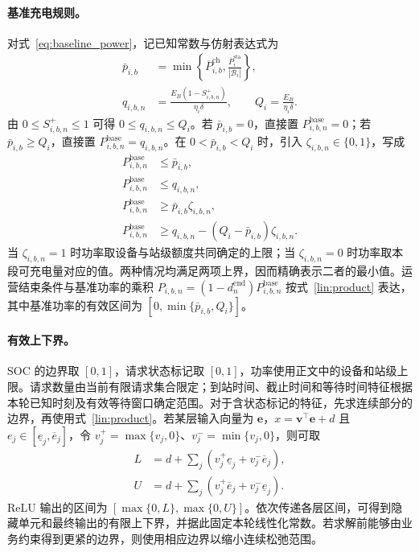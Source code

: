 \paragraph{基准充电规则。}
对式~\eqref{eq:baseline_power}，记已知常数与仿射表达式为
\begin{equation}
\begin{aligned}
\bar p_{i,b}
&=\min\left\{\overline P_{i,b}^{\mathrm{ch}},
\frac{\overline P_i^{\mathrm{sta}}}{|\mathcal B_i|}\right\},\\
q_{i,b,n}&=\frac{E_B(1-S_{i,b,n}^{+})}{\eta_i\delta},
\qquad Q_i=\frac{E_B}{\eta_i\delta}.
\end{aligned}
\label{lin:baseline_bounds}
\end{equation}
由 $0\le S_{i,b,n}^{+}\le1$ 可得 $0\le q_{i,b,n}\le Q_i$。若 $\bar p_{i,b}=0$，直接置 $P_{i,b,n}^{\mathrm{base}}=0$；若 $\bar p_{i,b}\ge Q_i$，直接置 $P_{i,b,n}^{\mathrm{base}}=q_{i,b,n}$。在 $0<\bar p_{i,b}<Q_i$ 时，引入 $\zeta_{i,b,n}\in\{0,1\}$，写成
\begin{equation}
\begin{aligned}
P_{i,b,n}^{\mathrm{base}}&\le\bar p_{i,b},\\
P_{i,b,n}^{\mathrm{base}}&\le q_{i,b,n},\\
P_{i,b,n}^{\mathrm{base}}&\ge\bar p_{i,b}\zeta_{i,b,n},\\
P_{i,b,n}^{\mathrm{base}}&\ge q_{i,b,n}-(Q_i-\bar p_{i,b})\zeta_{i,b,n}.
\end{aligned}
\label{lin:baseline_min}
\end{equation}
当 $\zeta_{i,b,n}=1$ 时功率取设备与站级额度共同确定的上限；当 $\zeta_{i,b,n}=0$ 时功率取本段可充电量对应的值。两种情况均满足两项上界，因而精确表示二者的最小值。运营结束条件与基准功率的乘积 $P_{i,b,n}=(1-d_n^{\mathrm{end}})P_{i,b,n}^{\mathrm{base}}$ 按式~\eqref{lin:product} 表达，其中基准功率的有效区间为 $[0,\min\{\bar p_{i,b},Q_i\}]$。

\paragraph{有效上下界。}
SOC 的边界取 $[0,1]$，请求状态标记取 $[0,1]$，功率使用正文中的设备和站级上限。请求数量由当前有限请求集合限定；到站时间、截止时间和等待时间特征根据本轮已知时刻及有效等待窗口确定范围。对于含状态标记的特征，先求连续部分的边界，再使用式~\eqref{lin:product}。若某层输入向量为 $\boldsymbol e$，$x=\boldsymbol v^\top\boldsymbol e+d$ 且 $e_j\in[\underline e_j,\overline e_j]$，令 $v_j^+=\max\{v_j,0\}$、$v_j^-=\min\{v_j,0\}$，则可取
\begin{equation}
\begin{aligned}
L&=d+\sum_j\left(v_j^+\underline e_j+v_j^-\overline e_j\right),\\
U&=d+\sum_j\left(v_j^+\overline e_j+v_j^-\underline e_j\right).
\end{aligned}
\label{lin:interval}
\end{equation}
ReLU 输出的区间为 $[\max\{0,L\},\max\{0,U\}]$。依次传递各层区间，可得到隐藏单元和最终输出的有限上下界，并据此固定本轮线性化常数。若求解前能够由业务约束得到更紧的边界，则使用相应边界以缩小连续松弛范围。


